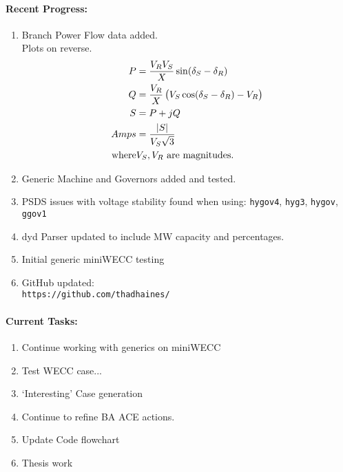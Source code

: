 \documentclass[12pt]{article}
\begin{document}
\begin{multicols}{2}
\raggedright
	\paragraph{Recent Progress:}
	\begin{enumerate}
\itemsep0em 
		\item Branch Power Flow data added. \\
Plots on reverse.
\begin{align}
P &= \dfrac{V_R V_S}{X} \sin(\delta_S - \delta_R)\\
Q &= \dfrac{V_R}{X} \left(V_S\cos(\delta_S - \delta_R)-V_R\right)\\
S &= P + jQ\\
Amps &= \dfrac{\abs{S}}{V_S\sqrt{3}}\\
\text{where} &V_S,V_R \text{ are magnitudes.}
\end{align}

		\item Generic Machine and Governors added and tested.
		\item PSDS issues with voltage stability found when using: 
\verb|hygov4|, 
\verb|hyg3|, 
\verb|hygov|, 
\verb|ggov1|
		\item dyd Parser updated to include MW capacity and percentages.
		\item Initial generic miniWECC testing

		\item GitHub updated:\\
		\verb|https://github.com/thadhaines/|
		
	\end{enumerate}
\paragraph{Current Tasks:}
	\begin{enumerate}
		\itemsep0em 
		\item Continue working with generics on miniWECC
		\item Test WECC case...
		\item `Interesting' Case generation
		\item Continue to refine BA ACE actions.
		\item Update Code flowchart%
		\item Thesis work 
		

\end{enumerate}
\end{multicols}
\end{document}
